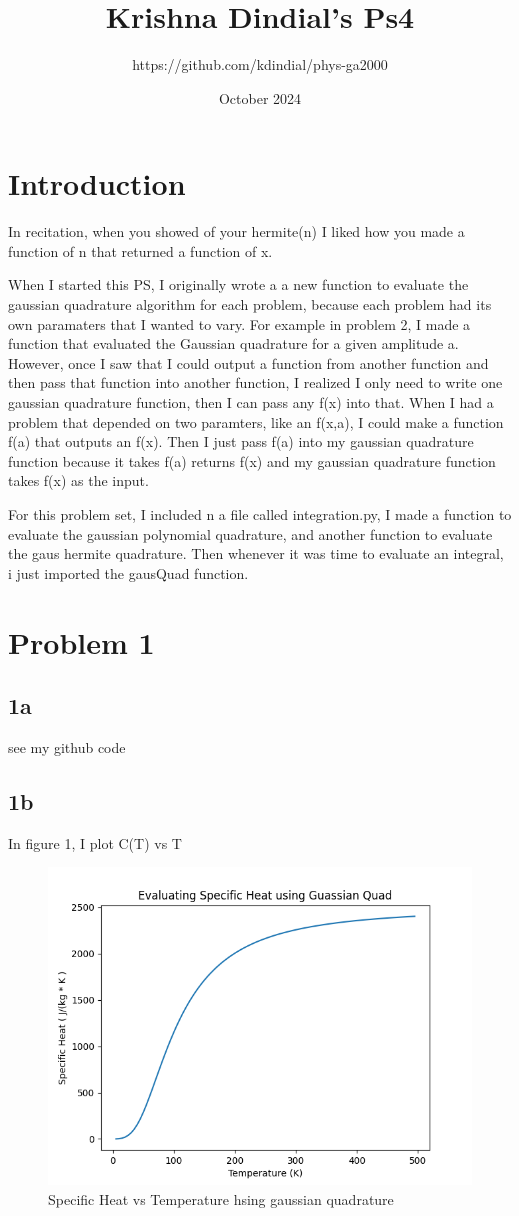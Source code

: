 \documentclass{article}
\title{{Krishna Dindial's Ps4}}
\author{https://github.com/kdindial/phys-ga2000 }
\date{October 2024}
\begin{document}
\maketitle

\section{Introduction}
In recitation, when you showed of your hermite(n) I liked how you made a function of n that returned a function of x.

When I started this PS, I originally wrote a a new function to evaluate the gaussian quadrature algorithm for each problem,  because each problem had its own paramaters that I wanted to vary. For example in problem 2, I made a function that evaluated the Gaussian quadrature for a given amplitude a. However, once I saw that I could output a function from another function and then pass that function into another function, I realized I only need to write one gaussian quadrature function, then I can pass any f(x) into that. When I had a problem that depended on two paramters, like an f(x,a), I could make a function f(a) that outputs an f(x). Then I just pass f(a) into my gaussian quadrature function because it takes f(a) returns f(x) and my gaussian quadrature function takes f(x) as the input.
\par
For this problem set, I included n a file called integration.py, I made a function to evaluate the gaussian polynomial quadrature, and another function to evaluate the gaus hermite quadrature. Then whenever it was time to evaluate an integral, i just imported the gausQuad function.

\section{Problem 1}
\subsection{1a}
see my github code
\subsection{1b}
In figure 1, I plot C(T) vs T
\begin{figure}[h!]
    \centering
    \includegraphics[width=.8\linewidth]{ps-4-1b.png}
    \caption{Specific Heat vs Temperature hsing gaussian quadrature}
    \label{fig:enter-label}
\end{figure}
\end{document}

